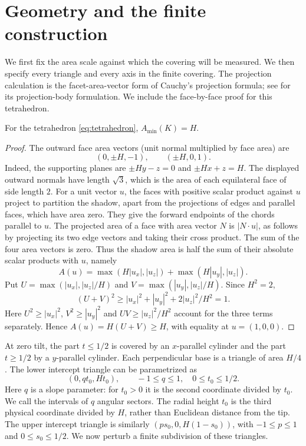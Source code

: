 \section{Geometry and the finite construction}\label{sec:construction}

We first fix the area scale against which the covering will be measured.
We then specify every triangle and every axis in the finite covering.
The projection calculation is the facet-area-vector form of Cauchy's
projection formula; see \cite[p.~83, equation~(1)]{Martini1991} for its
projection-body formulation. We include the face-by-face proof for this tetrahedron.

\begin{lemma}\label{lem:projection-minimum}
For the tetrahedron \eqref{eq:tetrahedron}, $A_{\min}(K)=H$.
\end{lemma}
\begin{proof}
The outward face area vectors (unit normal multiplied by face area) are
\[
 (0,\pm H,-1),\qquad (\pm H,0,1).
\]
Indeed, the supporting planes are $\pm Hy-z=0$ and
$\pm Hx+z=H$. The displayed outward normals have length $\sqrt3$,
which is the area of each equilateral face of side length $2$.
For a unit vector $u$, the faces with positive scalar product against $u$ project to partition the shadow, apart from the projections of edges and parallel faces, which have area zero.
They give the forward endpoints of the chords parallel to $u$.
The projected area of a face with area vector $N$ is $|N\cdot u|$,
as follows by projecting its two edge vectors and taking their cross product.
The sum of the four area vectors is zero. Thus the shadow area is half the sum of their absolute scalar products with $u$, namely
\[
 A(u)=\max(H|u_x|,|u_z|)+\max(H|u_y|,|u_z|).
\]
Put $U=\max(|u_x|,|u_z|/H)$ and $V=\max(|u_y|,|u_z|/H)$.
Since $H^2=2$,
\[
 (U+V)^2\ge |u_x|^2+|u_y|^2+2|u_z|^2/H^2=1.
\]
Here $U^2\ge|u_x|^2$, $V^2\ge|u_y|^2$ and
$UV\ge|u_z|^2/H^2$ account for the three terms separately.
Hence $A(u)=H(U+V)\ge H$, with equality at $u=(1,0,0)$.
\end{proof}

At zero tilt, the part $t\le1/2$ is covered by an $x$-parallel cylinder and the part $t\ge1/2$ by a $y$-parallel cylinder.
Each perpendicular base is a triangle of area $H/4$.
The lower intercept triangle can be parametrized as
\[
 (0,qt_0,Ht_0),\qquad -1\le q\le1,\quad 0\le t_0\le1/2.
\]
Here $q$ is a slope parameter: for $t_0>0$ it is the second coordinate
divided by $t_0$.
We call the intervals of $q$ angular sectors. The radial height $t_0$
is the third physical coordinate divided by $H$, rather than Euclidean
distance from the tip. The upper intercept triangle is similarly
$(ps_0,0,H(1-s_0))$, with $-1\le p\le1$ and $0\le s_0\le1/2$.
We now perturb a finite subdivision of these triangles.


